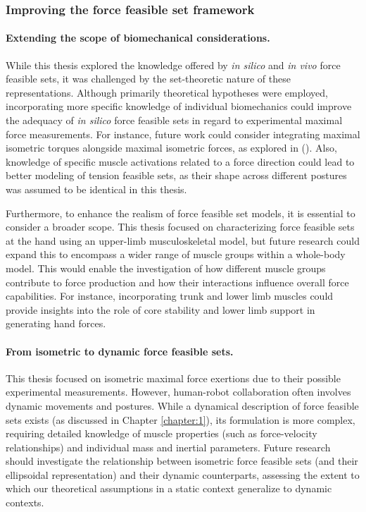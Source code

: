 \subsubsection*{Improving the force feasible set framework}

\paragraph*{Extending the scope of biomechanical considerations.} While this thesis explored the knowledge offered by \emph{in silico} and \emph{in vivo} force feasible sets, it was challenged by the set-theoretic nature of these representations. Although primarily theoretical hypotheses were employed, incorporating more specific knowledge of individual biomechanics could improve the adequacy of \emph{in silico} force feasible sets in regard to experimental maximal force measurements. For instance, future work could consider integrating maximal isometric torques alongside maximal isometric forces, as explored in (\cite{rezzougUpperLimbIsometricForce2021b}). Also, knowledge of specific muscle activations related to a force direction could lead to better modeling of tension feasible sets, as their shape across different postures was assumed to be identical in this thesis.

Furthermore, to enhance the realism of force feasible set models, it is essential to consider a broader scope. This thesis focused on characterizing force feasible sets at the hand using an upper-limb musculoskeletal model, but future research could expand this to encompass a wider range of muscle groups within a whole-body model. This would enable the investigation of how different muscle groups contribute to force production and how their interactions influence overall force capabilities. For instance, incorporating trunk and lower limb muscles could provide insights into the role of core stability and lower limb support in generating hand forces.

\paragraph*{From isometric to dynamic force feasible sets.} This thesis focused on isometric maximal force exertions due to their possible experimental measurements. However, human-robot collaboration often involves dynamic movements and postures. While a dynamical description of force feasible sets exists (as discussed in Chapter \ref{chapter:1}), its formulation is more complex, requiring detailed knowledge of muscle properties (such as force-velocity relationships) and individual mass and inertial parameters. Future research should investigate the relationship between isometric force feasible sets (and their ellipsoidal representation) and their dynamic counterparts, assessing the extent to which our theoretical assumptions in a static context generalize to dynamic contexts.

